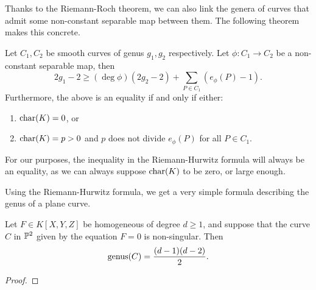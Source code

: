 Thanks to the Riemann-Roch theorem, we can also link the genera of 
curves that admit some non-constant separable map between them.
The following theorem makes this concrete.
\begin{theorem}
	Let $C_1, C_2$ be smooth curves of genus $g_1, g_2$ respectively.
	Let $\phi: C_1 \to C_2$ be a non-constant separable map, then
	\begin{equation*}
		2g_1 - 2 \geq (\deg \phi) (2g_2 - 2) + \sum_{P \in C_1}(e_\phi(P) - 1).
	\end{equation*}
	Furthermore, the above is an equality if and only if either:
	\begin{enumerate}[itemsep=0em, label=(\roman*)]
		\item $\operatorname{char}(K) = 0$, or
		\item $\operatorname{char}(K) = p > 0$ and $p$ does not divide $e_\phi(P)$ for all
			$P \in C_1$.
	\end{enumerate}
\end{theorem}

For our purposes, the inequality in the Riemann-Hurwitz formula
will always be an equality, as we can always suppose $\operatorname{char}(K)$ to be
zero, or large enough.

Using the Riemann-Hurwitz formula, we get a very simple formula describing
the genus of a plane curve.
\begin{corollary}
	\label{cor:genus-formula}
	Let $F \in K[X, Y, Z]$ be homogeneous of degree $d \geq 1$, and suppose that
	the curve $C$ in $\mathbb{P}^2$ given by the equation $F = 0$ is non-singular.
	Then
	\begin{equation*}
		\operatorname{genus}(C) = \frac{(d-1)(d-2)}{2}.
	\end{equation*}
\end{corollary}

\begin{proof}
\end{proof}


